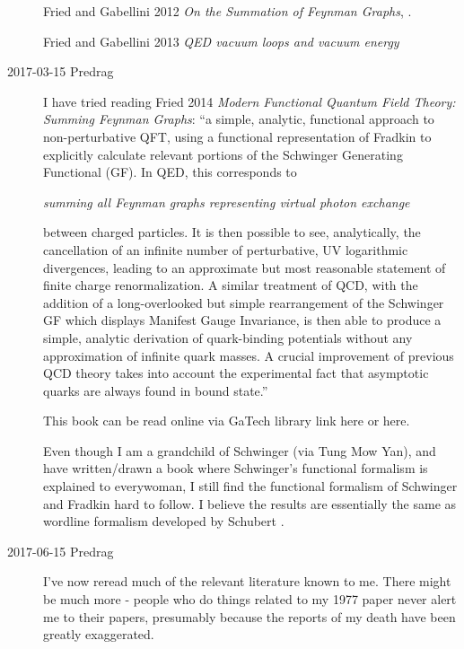 \begin{description}
Fried and Gabellini 2012
{\em On the Summation of Feynman Graphs}, .

Fried and Gabellini 2013
{\em {QED} vacuum loops and vacuum energy}

\item[2017-03-15 Predrag] I have tried reading
Fried 2014
{\em Modern Functional Quantum Field Theory: Summing Feynman Graphs}:
``a simple, analytic, functional approach to non-perturbative QFT, using a
functional representation of Fradkin to explicitly
calculate relevant portions of the Schwinger Generating Functional (GF).
In QED, this corresponds to

\emph{summing all Feynman graphs representing virtual photon exchange}

between charged particles. It is then possible to
see, analytically, the cancellation of an infinite number of
perturbative, UV logarithmic divergences, leading to an approximate but
most reasonable statement of finite charge renormalization. A similar
treatment of QCD, with the addition of a long-overlooked but simple
rearrangement of the Schwinger GF which displays Manifest Gauge
Invariance, is then able to produce a simple, analytic derivation of
quark-binding potentials without any approximation of infinite quark
masses. A crucial improvement of previous QCD theory takes into account
the experimental fact that asymptotic quarks are always found in bound
state.''

This book can be read online via GaTech library link
{here} or
{here}.

Even though I am a grandchild of Schwinger (via Tung Mow Yan), and have
written/drawn a book where Schwinger's functional formalism is explained
to everywoman, I still find the functional formalism of Schwinger and
Fradkin hard to follow. I believe the results are
essentially the same as wordline formalism developed by Schubert \etal.

\item[2017-06-15 Predrag]
I've now reread much of the relevant literature known to me. There might
be much more - people who do things related to my 1977 paper
never alert me to their papers, presumably because the reports of my
death have been greatly exaggerated.


\end{description}
